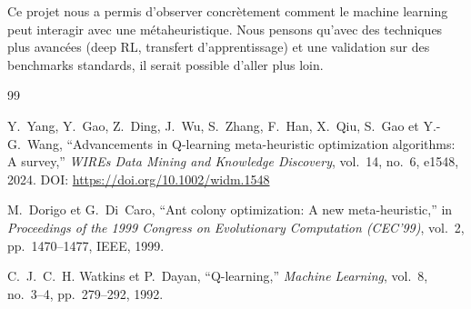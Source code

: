 \documentclass[12pt, a4paper]{article}
\begin{document}
Ce projet nous a permis d'observer concrètement comment le machine learning peut interagir avec une métaheuristique. Nous pensons qu'avec des techniques plus avancées (deep RL, transfert d'apprentissage) et une validation sur des benchmarks standards, il serait possible d'aller plus loin.

\begin{thebibliography}{99}

Y.~Yang, Y.~Gao, Z.~Ding, J.~Wu, S.~Zhang, F.~Han, X.~Qiu, S.~Gao et Y.-G.~Wang,
``Advancements in Q-learning meta-heuristic optimization algorithms: A survey,''
\textit{WIREs Data Mining and Knowledge Discovery}, vol.~14, no.~6, e1548, 2024.
\newline DOI: \url{https://doi.org/10.1002/widm.1548}

M.~Dorigo et G.~Di~Caro,
``Ant colony optimization: A new meta-heuristic,''
in \textit{Proceedings of the 1999 Congress on Evolutionary Computation (CEC'99)}, vol.~2, pp.~1470--1477, IEEE, 1999.

C.~J.~C.~H. Watkins et P.~Dayan,
``Q-learning,''
\textit{Machine Learning}, vol.~8, no.~3--4, pp.~279--292, 1992.

\end{thebibliography}
\end{document}
